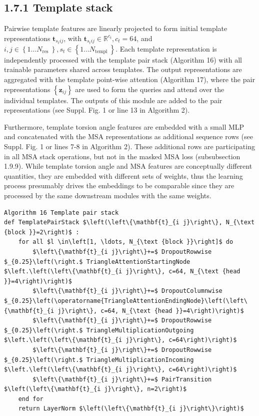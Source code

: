 \documentclass[10pt]{article}
\begin{document}
\subsection*{1.7.1 Template stack}
Pairwise template features are linearly projected to form initial template representations $\mathbf{t}_{s_{t} i j}$, with $\mathbf{t}_{s_{t} i j} \in \mathbb{R}^{c_{t}}, c_{t}=64$, and $i, j \in\left\{1 \ldots N_{\text {res }}\right\}, s_{t} \in\left\{1 \ldots N_{\text {templ }}\right\}$. Each template representation is independently processed with the template pair stack (Algorithm 16) with all trainable parameters shared across templates. The output representations are aggregated with the template point-wise attention (Algorithm 17), where the pair representations $\left\{\mathbf{z}_{i j}\right\}$ are used to form the queries and attend over the individual templates. The outputs of this module are added to the pair representations (see Suppl. Fig. 1 or line 13 in Algorithm 2).

Furthermore, template torsion angle features are embedded with a small MLP and concatenated with the MSA representations as additional sequence rows (see Suppl. Fig. 1 or lines 7-8 in Algorithm 2). These additional rows are participating in all MSA stack operations, but not in the masked MSA loss (subsubsection 1.9.9). While template torsion angle and MSA features are conceptually different quantities, they are embedded with different sets of weights, thus the learning process presumably drives the embeddings to be comparable since they are processed by the same downstream modules with the same weights.

\begin{verbatim}
Algorithm 16 Template pair stack
def TemplatePairStack $\left(\left\{\mathbf{t}_{i j}\right\}, N_{\text {block }}=2\right)$ :
    for all $l \in\left[1, \ldots, N_{\text {block }}\right]$ do
        $\left\{\mathbf{t}_{i j}\right\}+=$ DropoutRowwise $_{0.25}\left(\right.$ TriangleAttentionStartingNode $\left.\left(\left\{\mathbf{t}_{i j}\right\}, c=64, N_{\text {head }}=4\right)\right)$
        $\left\{\mathbf{t}_{i j}\right\}+=$ DropoutColumnwise $_{0.25}\left(\operatorname{TriangleAttentionEndingNode}\left(\left\{\mathbf{t}_{i j}\right\}, c=64, N_{\text {head }}=4\right)\right)$
        $\left\{\mathbf{t}_{i j}\right\}+=$ DropoutRowwise $_{0.25}\left(\right.$ TriangleMultiplicationOutgoing $\left.\left(\left\{\mathbf{t}_{i j}\right\}, c=64\right)\right)$
        $\left\{\mathbf{t}_{i j}\right\}+=$ DropoutRowwise $_{0.25}\left(\right.$ TriangleMultiplicationIncoming $\left.\left(\left\{\mathbf{t}_{i j}\right\}, c=64\right)\right)$
        $\left\{\mathbf{t}_{i j}\right\}+=$ PairTransition $\left(\left\{\mathbf{t}_{i j}\right\}, n=2\right)$
    end for
    return LayerNorm $\left(\left\{\mathbf{t}_{i j}\right\}\right)$
\end{verbatim}
\end{document}
